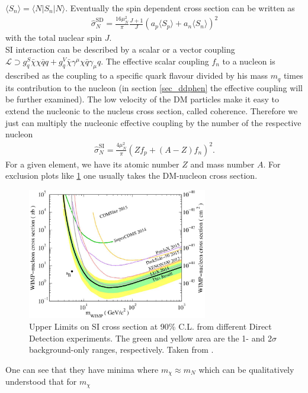 $\langle S_n\rangle = \langle N|S_n|N\rangle$. Eventually the spin dependent cross section can be written as
\begin{align}
 \hat\sigma_N^\text{SD} = \frac{16\mu_N^2}{\pi} \frac{J+1}{J}\left(a_p \langle S_p\rangle + a_n \langle S_n \rangle\right)^2
 \label{eq_SDsigma}
\end{align}
with the total nuclear spin $J$.\\
\noindent SI interaction can be described by a scalar or a vector coupling 
$\mathcal{L} \supset g_q^S \bar \chi \chi \bar q q + g_q^V \bar \chi \gamma^\mu \chi \bar q \gamma_\mu q$. The effective scalar coupling $f_n$
to a nucleon is described as the coupling to a specific quark flavour divided by his mass $m_q$ times its contribution to the nucleon (in section
\ref{sec_ddphen} the effective coupling will be further examined). The low velocity of the DM particles make it easy to extend the nucleonic to the 
nucleus cross section, called coherence.  Therefore
we just can multiply the nucleonic effective coupling by the number of the respective nucleon
\begin{align}
 \hat\sigma_N^\text{SI} = \frac{4\mu_N^2}{\pi} \left(Z f_p + (A-Z) f_n\right)^2.
 \label{eq_th.sigma.dd}
\end{align}
For a given element, we have its atomic number $Z$ and mass number $A$. For exclusion plots like \ref{pic_ddbounds} one usually takes the 
DM-nucleon cross section. 
\begin{figure}[t]
 \includegraphics[width=0.7\textwidth]{../pics/ddLux.jpeg}
 \caption{Upper Limits on SI cross section at 90\% C.L. from different Direct Detection experiments. The green and yellow area are the 1- and 2$\sigma$
 background-only ranges, respectively. Taken from \cite{1512.03506}.}
 \label{pic_ddbounds}
\end{figure}
One can see that they have minima where $m_\chi\approx m_N$ which can be qualitatively understood that for $m_\chi$ 
